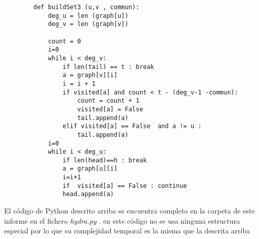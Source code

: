 \documentclass[12pt]{article}
\begin{document}
    \begin{verbatim}
        def buildSet3 (u,v , commun):
            deg_u = len (graph[u]) 
            deg_v = len (graph[v]) 

            count = 0 
            i=0
            while i < deg_v:
                if len(tail) == t : break 
                a = graph[v][i]
                i = i + 1
                if visited[a] and count < t - (deg_v-1 -commun):     
                    count = count + 1
                    visited[a] = False 
                    tail.append(a)
                elif visited[a] == False  and a != u :
                    tail.append(a)
            i=0 
            while i < deg_u:
                if len(head)==h : break 
                a = graph[u][i]
                i=i+1
                if  visited[a] == False : continue 
                head.append(a) 
    \end{verbatim}

    \noindent El c\'odigo de Python descrito arriba se encuentra completo en la carpeta de este informe en el fichero \textit{hydra.py} . en este c\'odigo no se usa ninguna estructura especial por lo que su complejidad temporal es la misma que la descrita arriba 
\end{document}
